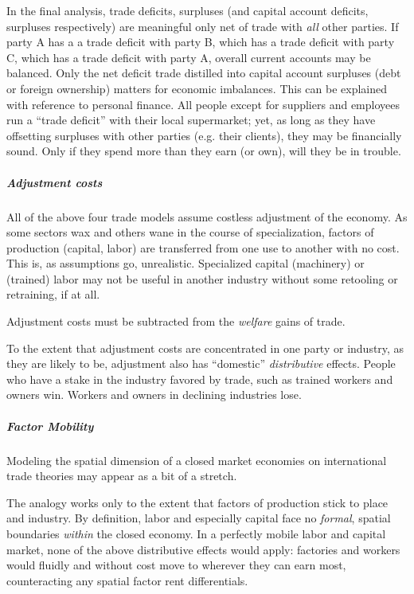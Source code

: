 In the final analysis, trade deficits, surpluses (and capital account deficits, surpluses respectively) are meaningful only net of trade with \emph{all} other parties. If party A has a a trade deficit with party B, which has a trade deficit with party C, which has a trade deficit with party A, overall current accounts may be balanced. Only the net deficit trade distilled into capital account surpluses (debt or foreign ownership) matters for economic imbalances. This can be explained with reference to personal finance. All people except for suppliers and employees run a ``trade deficit'' with their local supermarket; yet, as long as they have offsetting surpluses with other parties (e.g. their clients), they may be financially sound. Only if they spend more than they earn (or own), will they be in trouble.%

\subparagraph{Adjustment costs}  \label{sec:adjustment_costs}
All of the above four trade models assume costless adjustment of the economy. As some sectors wax and others wane in the course of specialization, factors of production (capital, labor) are transferred from one use to another with no cost. This is, as assumptions go, unrealistic. Specialized capital (machinery) or (trained) labor may not be useful in another industry without some retooling or retraining, if at all. 

Adjustment costs must be subtracted from the \emph{welfare} gains of trade.

To the extent that adjustment costs are concentrated in one party or industry, as they are likely to be, adjustment also has ``domestic'' \emph{distributive} effects. People who have a stake in the industry favored by trade, such as trained workers and owners win. Workers and owners in declining industries lose.

\subparagraph{Factor Mobility}  \label{sec:factor_mobility_trade}
Modeling the spatial dimension of a closed market economies on international trade theories may appear as a bit of a stretch. 

The analogy works only to the extent that factors of production stick to place and industry. By definition, labor and especially capital face no \emph{formal}, spatial boundaries \emph{within} the closed economy. In a perfectly mobile labor and capital market, none of the above distributive effects would apply: factories and workers would fluidly and without cost move to wherever they can earn most, counteracting any spatial factor rent differentials. 

